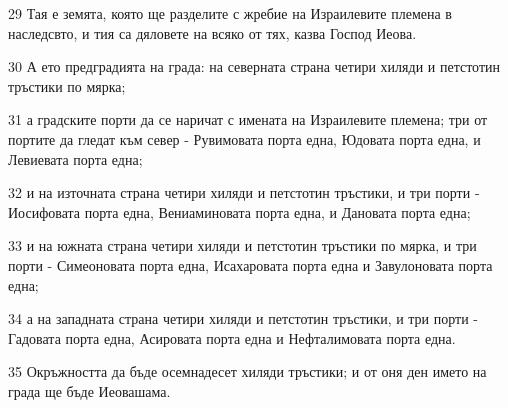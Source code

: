 \par 29 Тая е земята, която ще разделите с жребие на Израилевите племена в наследсвто, и тия са дяловете на всяко от тях, казва Господ Иеова.
\par 30 А ето предградията на града: на северната страна четири хиляди и петстотин тръстики по мярка;
\par 31 а градските порти да се наричат с имената на Израилевите племена; три от портите да гледат към север - Рувимовата порта една, Юдовата порта една, и Левиевата порта една;
\par 32 и на източната страна четири хиляди и петстотин тръстики, и три порти - Иосифовата порта една, Вениаминовата порта една, и Дановата порта една;
\par 33 и на южната страна четири хиляди и петстотин тръстики по мярка, и три порти - Симеоновата порта една, Исахаровата порта една и Завулоновата порта една;
\par 34 а на западната страна четири хиляди и петстотин тръстики, и три порти - Гадовата порта една, Асировата порта една и Нефталимовата порта една.
\par 35 Окръжността да бъде осемнадесет хиляди тръстики; и от оня ден името на града ще бъде Иеовашама.

